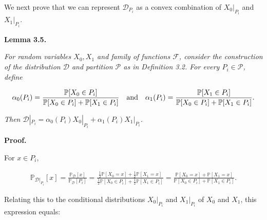 \documentclass[10pt,a4paper]{article}
\begin{document}
We next prove that we can represent $\mathcal{D}_{P_{i}}$ as a convex combination of $X_{0}|_{P_{i}}$ and $X_{1}|_{P_{i}}$.\par





\par\medskip\noindent\textbf{
\textbf{Lemma 3.5}\textbf{.}
}\par



\emph{For random variables $X_{0},X_{1}$ and family of functions $\mathcal{F}$, consider the construction of the distribution $\mathcal{D}$ and partition $\mathcal{P}$ as in Definition 3.2. For every $P_{i}\in\mathcal{P}$, define}\par


\[\begin{gathered}
\alpha_{0}(P_{i})=\frac{\mathbb{P}[X_{0}\in P_{i}]}{\mathbb{P}[X_{0}\in P_{i}]+\mathbb{P}[X_{1}\in P_{i}]}\nobreak\ \nobreak\ \text{ and }\nobreak\ \nobreak\ \alpha_{1}(P_{i})=\frac{\mathbb{P}[X_{1}\in P_{i}]}{\mathbb{P}[X_{0}\in P_{i}]+\mathbb{P}[X_{1}\in P_{i}]}.
\end{gathered}\]


\emph{Then $\mathcal{D}|_{P_{i}}=\alpha_{0}(P_{i})X_{0}|_{P_{i}}+\alpha_{1}(P_{i})X_{1}|_{P_{i}}$.}\par







\par\medskip\noindent\textbf{Proof.}\par




For $x\in P_{i}$,\par


\[\begin{gathered}
\mathbb{P}_{\mathcal{D}|_{P_{i}}}[x]=\frac{\mathbb{P}_{\mathcal{D}}[x]}{\mathbb{P}_{\mathcal{D}}[P_{i}]}=\frac{\frac{1}{2}\mathbb{P}[X_{0}=x]+\frac{1}{2}\mathbb{P}[X_{1}=x]}{\frac{1}{2}\mathbb{P}[X_{0}\in P_{i}]+\frac{1}{2}\mathbb{P}[X_{1}\in P_{i}]}=\frac{\mathbb{P}[X_{0}=x]+\mathbb{P}[X_{1}=x]}{\mathbb{P}[X_{0}\in P_{i}]+\mathbb{P}[X_{1}\in P_{i}]}.
\end{gathered}\]


Relating this to the conditional distributions $X_{0}|_{P_{i}}$ and $X_{1}|_{P_{i}}$ of $X_{0}$ and $X_{1}$, this expression equals:\par
\end{document}
